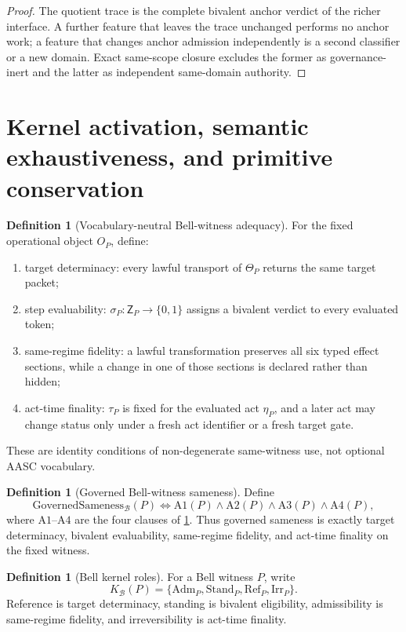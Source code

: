 \documentclass[11pt]{article}
\theoremstyle{definition}
\newtheorem{definition}[theorem]{Definition}
\newcommand{\Adm}{\mathrm{Adm}}
\newcommand{\Stand}{\mathrm{Stand}}
\newcommand{\RefRole}{\mathrm{Ref}}
\newcommand{\Irr}{\mathrm{Irr}}
\newcommand{\Bell}{\mathcal{B}}
\newcommand{\Kbell}{K_{\Bell}}
\newcommand{\GovSame}{\mathrm{GovernedSameness}_{\Bell}}
\begin{document}
\begin{proof}
The quotient trace is the complete bivalent anchor verdict of the richer interface. A further feature that leaves the trace unchanged performs no anchor work; a feature that changes anchor admission independently is a second classifier or a new domain. Exact same-scope closure excludes the former as governance-inert and the latter as independent same-domain authority.
\end{proof}

\section{Kernel activation, semantic exhaustiveness, and primitive conservation}\label{sec:kernelroles}

\begin{definition}[Vocabulary-neutral Bell-witness adequacy]\label{def:neutraladequacy}
For the fixed operational object $O_P$, define:
\begin{enumerate}[label=(A\arabic*),leftmargin=3em]
\item target determinacy: every lawful transport of $\Theta_P$ returns the same target packet;
\item step evaluability: $\sigma_P:\mathsf Z_P\to\{0,1\}$ assigns a bivalent verdict to every evaluated token;
\item same-regime fidelity: a lawful transformation preserves all six typed effect sections, while a change in one of those sections is declared rather than hidden;
\item act-time finality: $\tau_P$ is fixed for the evaluated act $\eta_P$, and a later act may change status only under a fresh act identifier or a fresh target gate.
\end{enumerate}
These are identity conditions of non-degenerate same-witness use, not optional AASC vocabulary.
\end{definition}

\begin{definition}[Governed Bell-witness sameness]\label{def:governedsameness}
Define
\[
\GovSame(P)
\iff
\mathrm{A1}(P)\wedge\mathrm{A2}(P)\wedge\mathrm{A3}(P)\wedge\mathrm{A4}(P),
\]
where $\mathrm{A1}$--$\mathrm{A4}$ are the four clauses of \cref{def:neutraladequacy}. Thus governed sameness is exactly target determinacy, bivalent evaluability, same-regime fidelity, and act-time finality on the fixed witness.
\end{definition}

\begin{definition}[Bell kernel roles]
For a Bell witness $P$, write
\[
\Kbell(P)=\{\Adm_P,\Stand_P,\RefRole_P,\Irr_P\}.
\]
Reference is target determinacy, standing is bivalent eligibility, admissibility is same-regime fidelity, and irreversibility is act-time finality.
\end{definition}
\end{document}
